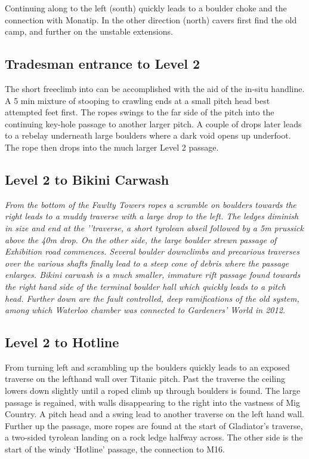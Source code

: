  Continuing along  to the left (south) quickly leads to a boulder choke and the connection with Monatip. In the other direction (north) cavers first find the old  camp, and further on the unstable  extensions.

\subsection{Tradesman entrance to Level 2}
The short freeclimb into  can be accomplished with the aid of the in-situ handline. A 5 min mixture of stooping to crawling ends at a small pitch head best attempted feet first. The ropes swings to the far side of the pitch into the continuing key-hole passage  to another larger pitch. A couple of drops later leads to a rebelay underneath large boulders where a dark void opens up underfoot. The rope then drops into the much larger Level 2 passage.

\subsection{Level 2 to Bikini Carwash}
\textit{From the bottom of the Fawlty Towers ropes a scramble on boulders towards the right leads to a muddy traverse with a large drop to the left. The ledges diminish in size and end at the '\protect{}'traverse, a short tyrolean abseil followed by a 5m prussick above the 40m drop. On the other side, the large boulder strewn passage of Exhibition road commences. Several boulder downclimbs and precarious traverses over the various shafts finally lead to a steep cone of debris where the passage enlarges. Bikini carwash is a much smaller, immature rift passage found towards the right hand side of the terminal boulder hall which quickly leads to a pitch head. Further down are the fault controlled, deep ramifications of the old system, among which Waterloo chamber was connected to Gardeners' World in 2012.}

\subsection{Level 2 to  Hotline}
From  turning left and scrambling up the boulders quickly leads to an exposed traverse on the lefthand wall over Titanic pitch. Past the traverse the ceiling lowers down slightly until a roped climb up through boulders is found. The large passage is regained, with walls disappearing to the right into the vastness of Mig Country. A pitch head and a swing lead to another traverse on the left hand wall. Further up the passage, more ropes are found at the start of Gladiator’s traverse, a two-sided tyrolean landing on a rock ledge halfway across. The other side is the start of the windy ‘Hotline’ passage, the connection to M16.

